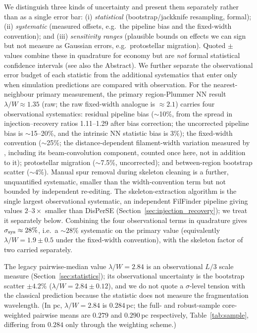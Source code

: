 \documentclass[usenatbib,twoside,twocolumn]{mnras}
\begin{document}
We distinguish three kinds of uncertainty and present them separately rather than as a single error bar: (i) \emph{statistical} (bootstrap/jackknife resampling, formal); (ii) \emph{systematic} (measured offsets, e.g.\ the pipeline bias and the fixed-width convention); and (iii) \emph{sensitivity ranges} (plausible bounds on effects we can sign but not measure as Gaussian errors, e.g.\ protostellar migration). Quoted $\pm$ values combine these in quadrature for economy but are \emph{not} formal statistical confidence intervals (see also the Abstract). We further separate the observational error budget of each statistic from the additional systematics that enter only when simulation predictions are compared with observation. For the nearest-neighbour primary measurement, the primary region-Plummer NN result $\lambda/W\approx1.35$ (raw; the raw fixed-width analogue is $\approx2.1$) carries four observational systematics: residual pipeline bias ($\sim$10\%, from the spread in injection--recovery ratios 1.11--1.29 after bias correction; the uncorrected pipeline bias is $\sim$15--20\%, and the intrinsic NN statistic bias is 3\%); the fixed-width convention ($\sim$25\%; the distance-dependent filament-width variation measured by \citealt{Panopoulou2022}, including its beam-convolution component, counted once here, not in addition to it); protostellar migration ($\sim$7.5\%, uncorrected); and between-region bootstrap scatter ($\sim$4\%). Manual spur removal during skeleton cleaning is a further, unquantified systematic, smaller than the width-convention term but not bounded by independent re-editing. The skeleton-extraction algorithm is the single largest observational systematic, an independent FilFinder pipeline giving values $2$--$3\times$ smaller than DisPerSE (Section~\ref{sec:injection_recovery}); we treat it separately below. Combining the four observational terms in quadrature gives $\sigma_{\rm sys}\approx28\%$, i.e.\ a $\sim28\%$ systematic on the primary value (equivalently $\lambda/W=1.9\pm0.5$ under the fixed-width convention), with the skeleton factor of two carried separately.

The legacy pairwise-median value $\lambda/W=2.84$ is an observational $L/3$ scale measure (Section~\ref{sec:statistics}); its observational uncertainty is the bootstrap scatter $\pm4.2\%$ ($\lambda/W=2.84\pm0.12$), and we do not quote a $\sigma$-level tension with the classical prediction because the statistic does not measure the fragmentation wavelength. (In pc, $\lambda/W=2.84$ is $0.284$\,pc; the full- and robust-sample core-weighted pairwise means are $0.279$ and $0.290$\,pc respectively, Table~\ref{tab:sample}, differing from $0.284$ only through the weighting scheme.)
\end{document}
